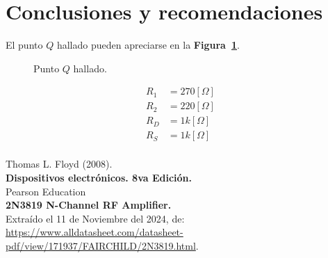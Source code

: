 \documentclass[letter,twoside,11pt]{article}
\begin{document}
\section{Conclusiones y recomendaciones}
El punto $Q$ hallado pueden apreciarse en la \textbf{Figura~\ref{curve2}}.
\begin{figure}[!h]
    \centering
    
    \caption{Punto $Q$ hallado.}
    \label{curve2}
\end{figure}

\begin{equation*}
    \begin{split}
        R_1 &= 270[\Omega]\\
        R_2 &= 220[\Omega]\\
        R_D &= 1k[\Omega]\\
        R_S &= 1k[\Omega]\\
    \end{split}
\end{equation*}

\begin{thebibliography}{99}

Thomas L. Floyd (2008).\\
\textbf{Dispositivos electrónicos. 8va Edición.}\\
Pearson Education\\

 \textbf{2N3819 N-Channel RF Amplifier.}\\
Extraído el 11 de Noviembre del 2024, de: \\
\url{https://www.alldatasheet.com/datasheet-pdf/view/171937/FAIRCHILD/2N3819.html}.

\end{thebibliography}
\end{document}
